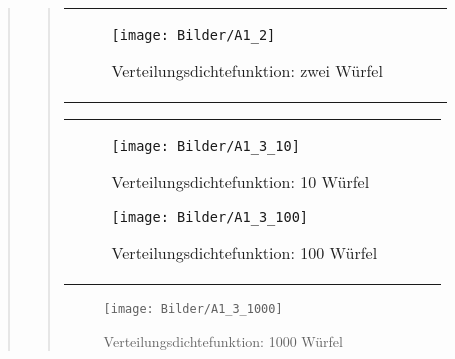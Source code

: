 \begin{quote}
\begin{quote}
\begin{center}
\begin{tabular}{ll}
            \begin{minipage}{0.6\textwidth}
                \begin{figure}[H]
                    \label{fig:pico_funktion0alpha}
                    \texttt{[image: Bilder/A1\_2]}
                    \caption{Verteilungsdichtefunktion: zwei Würfel}
                \end{figure}
        
            \end{minipage}
        
        \end{tabular}
        \end{center}

        \begin{center}
        \begin{tabular}{ll}
        
        \hspace{-5cm}
            \begin{minipage}{0.6\textwidth}
                
                \begin{figure}[H]
                    \label{fig:funktion0alpha}
                    \texttt{[image: Bilder/A1\_3\_10]}
                    \caption{Verteilungsdichtefunktion: 10 Würfel}
                \end{figure}
        
            \end{minipage}
        
            \begin{minipage}{0.6\textwidth}
                \begin{figure}[H]
                    \label{fig:pico_funktion0alpha}
                    \texttt{[image: Bilder/A1\_3\_100]}
                    \caption{Verteilungsdichtefunktion: 100 Würfel}
                \end{figure}
        
            \end{minipage}
        
        \end{tabular}
        \end{center}


        \begin{figure}[H]
        \centering
            \texttt{[image: Bilder/A1\_3\_1000]}
                \caption{Verteilungsdichtefunktion: 1000 Würfel}
                \label{fig:A1_3_1000}
        \end{figure}
    



\end{quote}
\end{quote}

